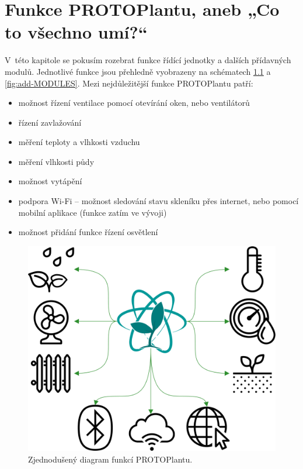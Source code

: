 \chapter{Funkce PROTOPlantu, aneb „Co to všechno umí?“}
V~této kapitole se pokusím rozebrat funkce řídící jednotky a dalších přídavných modulů.
Jednotlivé funkce jsou přehledně vyobrazeny na schématech \ref{fig:FEATURES_WHOLE_SMALL} a \ref{fig:add-MODULES}.
Mezi nejdůležitější funkce PROTOPlantu patří:
\begin{itemize}
    \item možnost řízení ventilace pomocí otevírání oken, nebo ventilátorů
    \item řízení zavlažování
    \item měření teploty a vlhkosti vzduchu
    \item měření vlhkosti půdy
    \item možnost vytápění
    \item podpora Wi-Fi -- možnost sledování stavu skleníku přes internet, nebo pomocí mobilní aplikace (funkce zatím ve vývoji)
    \item možnost přidání funkce řízení osvětlení
\end{itemize}

\begin{figure}[htbp]
    \centering
    \includegraphics[scale=0.7]{img/FUNCTIONS/PROTOPLANT_FC.png}
    \caption{Zjednodušený diagram funkcí PROTOPlantu.}
    \label{fig:FEATURES_WHOLE_SMALL}
\end{figure}

